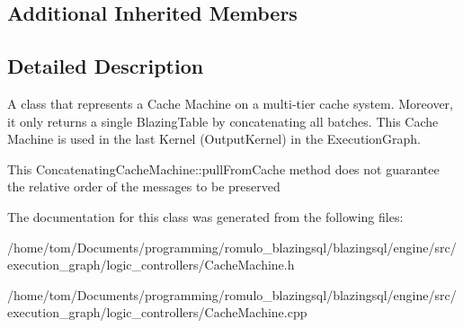 \subsection*{Additional Inherited Members}


\subsection{Detailed Description}
A class that represents a Cache Machine on a multi-\/tier cache system. Moreover, it only returns a single Blazing\+Table by concatenating all batches. This Cache Machine is used in the last Kernel (Output\+Kernel) in the Execution\+Graph. 

This Concatenating\+Cache\+Machine\+::pull\+From\+Cache method does not guarantee the relative order of the messages to be preserved 

The documentation for this class was generated from the following files\+:\begin{DoxyCompactItemize}
\item 
/home/tom/\+Documents/programming/romulo\+\_\+blazingsql/blazingsql/engine/src/execution\+\_\+graph/logic\+\_\+controllers/Cache\+Machine.\+h\item 
/home/tom/\+Documents/programming/romulo\+\_\+blazingsql/blazingsql/engine/src/execution\+\_\+graph/logic\+\_\+controllers/Cache\+Machine.\+cpp\end{DoxyCompactItemize}
